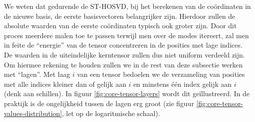 We weten dat gedurende de ST-HOSVD, bij het berekenen van de co\"ordinaten in de nieuwe basis, de eerste basisvectoren belangrijker zijn. Hierdoor zullen de absolute waarden van de eerste co\"ordinaten typisch ook groter zijn. Door dit proces meerdere malen toe te passen terwijl men over de modes itereert, zal men in feite de ``energie'' van de tensor concentreren in de posities met lage indices. De waarden in de uiteindelijke kerntensor zullen dus niet uniform verdeeld zijn.\\

Om hiermee rekening te houden zullen we in de rest van deze subsectie werken met ``lagen''. Met laag $i$ van een tensor bedoelen we de verzameling van posities met alle indices kleiner dan of gelijk aan $i$ en minstens \'e\'en index gelijk aan $i$ (denk aan schillen). In figuur \ref{fig:core-tensor-layers} wordt dit ge\"illustreerd. In de praktijk is de ongelijkheid tussen de lagen erg groot (zie figuur \ref{fig:core-tensor-values-distribution}, let op de logaritmische schaal).\\

